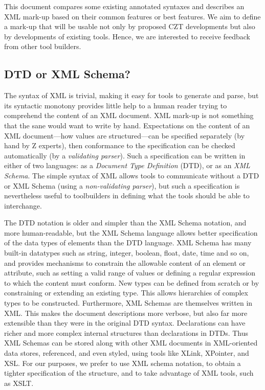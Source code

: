 \documentclass{llncs}  %
\begin{document}
This document compares some existing annotated syntaxes and describes an
XML mark-up based on their common features or best features. 
We aim to define a mark-up that will be usable not only by proposed CZT
developments but also by developments of existing tools.  Hence,
we are interested to receive feedback from other tool builders.


\subsection{DTD or XML Schema?}

The syntax of XML\cite{XML} is trivial,
making it easy for tools to generate and parse,
but its syntactic monotony provides little help to a human reader
trying to comprehend the content of an XML document.
XML mark-up is not something that the sane would want to write by hand.
Expectations on the content of an XML document---how values are
structured---can be specified separately (by hand by Z experts),
then conformance to the specification can be checked automatically
(by a \textit{validating parser}).
Such a specification can be written in either of two languages:
as a \textit{Document Type Definition} (DTD), or as an \textit{XML Schema}.
The simple syntax of XML allows tools to communicate
without a DTD or XML Schema (using a \textit{non-validating parser}),
but such a specification is nevertheless useful to toolbuilders
in defining what the tools should be able to interchange.

The DTD notation is older and simpler than the XML Schema notation,
and more human-readable, but 
the XML Schema language allows better specification of the data types
of elements than the DTD language.  XML Schema has many built-in
datatypes such as string, integer, boolean, float, date, time and so
on, and provides mechanisms to constrain the allowable
content of an element or attribute, such as setting a valid range of
values or defining a regular expression to which the content must
conform.  New types can be defined from scratch or by constraining or
extending an existing type.  This allows hierarchies of complex types
to be constructed.  
Furthermore, XML Schemas are themselves written in XML.  This
makes the document descriptions more verbose, but also far more
extensible than they were in the original DTD syntax. Declarations can
have richer and more complex internal structures than declarations in
DTDs. Thus XML Schemas can be stored along with other XML documents in
XML-oriented data stores, referenced, and even styled, using tools
like XLink, XPointer, and XSL. For our purposes, we prefer to use XML
schema notation, to obtain a tighter specification of the structure,
and to take advantage of XML tools, such as XSLT.
\end{document}
